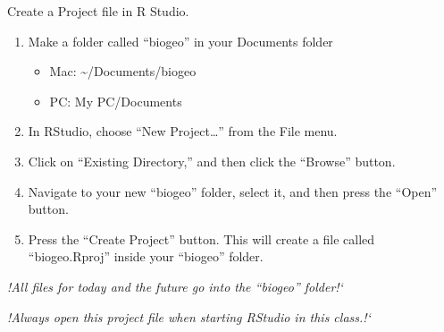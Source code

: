 \documentclass[t]{beamer}
\begin{document}
\begin{frame}[t]{Create a Project file in R Studio.}

\begin{enumerate}
\item Make a folder called “biogeo” in your Documents folder
\begin{itemize}
\item Mac: \textasciitilde/Documents/biogeo
\item PC: My PC/Documents

\end{itemize}

	\item In RStudio, choose “New Project…” from the File menu.
	
	\item Click on “Existing Directory,” and then click the “Browse” button. 
	
	\item Navigate to your new “biogeo” folder, select it, and then press the “Open” button.
	
	\item Press the “Create Project” button. This will create a file called “biogeo.Rproj” inside your “biogeo” folder.

\end{enumerate}
	
	\hangpara \textit{!All files for today and the future go into the “biogeo” folder!`}
	
	\hangpara \textit{!Always open this project file when starting RStudio in this class.!`}
	
\end{frame}

%
%
\end{document}
